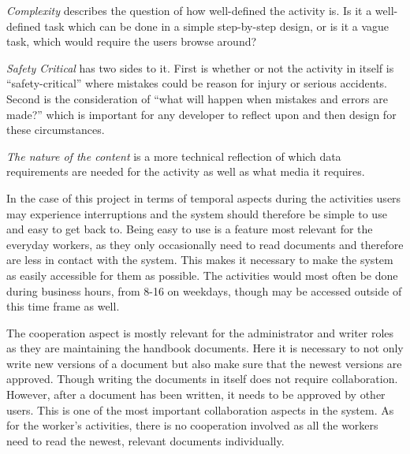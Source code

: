 \textit{Complexity} describes the question of how well-defined the activity is.
Is it a well-defined task which can be done in a simple step-by-step design, or is it a vague task, which would require the users browse around?

\textit{Safety Critical} has two sides to it.
First is whether or not the activity in itself is ``safety-critical'' where mistakes could be reason for injury or serious accidents.
Second is the consideration of ``what will happen when mistakes and errors are made?'' which is important for any developer to reflect upon and then design for these circumstances.

\textit{The nature of the content} is a more technical reflection of which data requirements are needed for the activity as well as what media it requires.

In the case of this project in terms of temporal aspects during the activities users may experience interruptions and the system should therefore be simple to use and easy to get back to.
Being easy to use is a feature most relevant for the everyday workers, as they only occasionally need to read documents and therefore are less in contact with the system.
This makes it necessary to make the system as easily accessible for them as possible.
The activities would most often be done during business hours, from 8-16 on weekdays, though may be accessed outside of this time frame as well.

The cooperation aspect is mostly relevant for the administrator and writer roles as they are maintaining the handbook documents.
Here it is necessary to not only write new versions of a document but also make sure that the newest versions are approved.
Though writing the documents in itself does not require collaboration.
However, after a document has been written, it needs to be approved by other users.
This is one of the most important collaboration aspects in the system.
As for the worker's activities, there is no cooperation involved as all the workers need to read the newest, relevant documents individually.

